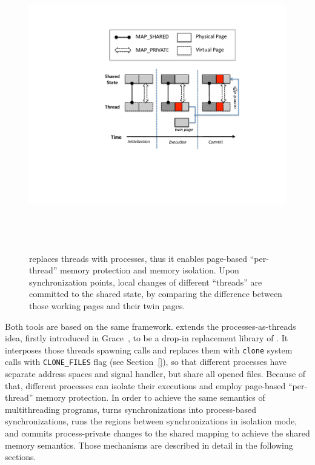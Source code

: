 \label{sec:overview}


%
\begin{figure}[!t]
\centering
\includegraphics[height=5in]{sheriff/figure/sheriffframework.pdf}
\caption{
\Sheriff{} replaces threads with processes, thus it enables page-based ``per-thread'' memory protection and memory isolation. Upon synchronization points, local changes of different ``threads'' are committed to the shared state, by comparing the difference between those working pages and their twin pages. \label{fig:overview}}
\end{figure}

Both tools are based on the same \sheriff{} framework. \sheriff{} extends the processes-as-threads idea, firstly introduced in Grace~\cite{grace}, to be a drop-in replacement library of \pthreads{}. It interposes those threads spawning calls and replaces them with \texttt{clone} system calls with \texttt{CLONE\_FILES} flag (see Section~\ref{}), so that different processes have separate address spaces and signal handler, but share all opened files. Because of that, different processes can isolate their executions and employ page-based ``per-thread'' memory protection. In order to achieve the same semantics of multithreading programs, \sheriff{} turns synchronizations into process-based synchronizations, runs the regions between synchronizations in isolation mode, and commits process-private changes to the shared mapping to achieve the shared memory semantics. Those mechanisms are described in detail in the following sections. 

